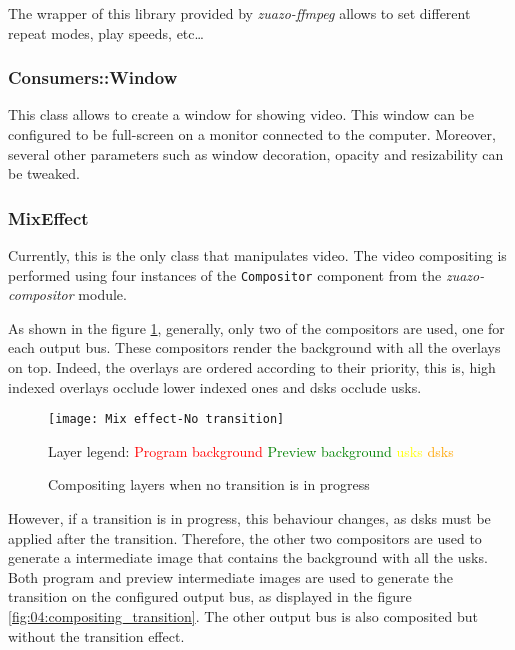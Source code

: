 \documentclass[../main.tex]{subfiles}
\begin{document}
The wrapper of this library provided by \textit{zuazo-ffmpeg} allows to set different repeat modes, play speeds, etc\dots

\subsubsection{Consumers::Window}
This class allows to create a window for showing video. This window can be configured to be full-screen on a monitor connected to the computer. Moreover, several other parameters such as window decoration, opacity and resizability can be tweaked.

\subsubsection{MixEffect}
Currently, this is the only class that manipulates video. The video compositing is performed using four instances of the \texttt{Compositor} component from the \textit{zuazo-compositor} module.\newline

As shown in the figure \ref{fig:04:compositing_no_transition}, generally, only two of the compositors are used, one for each output bus. These compositors render the background with all the overlays on top. Indeed, the overlays are ordered according to their priority, this is, high indexed overlays occlude lower indexed ones and \glspl{dsk} occlude \glspl{usk}.\newline

\begin{figure}[htbp]
    \centering
    \texttt{[image: Mix effect-No transition]}

    Layer legend: \textcolor{red}{Program background} \textcolor{green}{Preview background} \textcolor{yellow}{\glspl{usk}} \textcolor{orange}{\glspl{dsk}}
    \caption{Compositing layers when no transition is in progress}
    \label{fig:04:compositing_no_transition}
\end{figure}

However, if a transition is in progress, this behaviour changes, as \glspl{dsk} must be applied after the transition. Therefore, the other two compositors are used to generate a intermediate image that contains the background with all the \glspl{usk}. Both program and preview intermediate images are used to generate the transition on the configured output bus, as displayed in the figure \ref{fig:04:compositing_transition}. The other output bus is also composited but without the transition effect.
\end{document}
